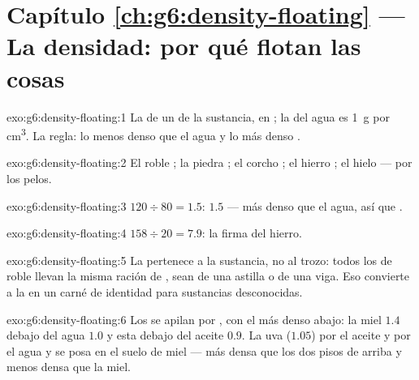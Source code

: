 \section*{Capítulo \ref{ch:g6:density-floating} --- La densidad: por qué flotan las cosas}

\begin{solution}{exo:g6:density-floating:1}
La  de un  de la sustancia, en
; la del agua es \qty{1}{g} por \unit{cm^3}. La regla: lo menos
denso que el agua  y lo más denso .
\end{solution}

\begin{solution}{exo:g6:density-floating:2}
El roble ; la piedra ; el corcho ; el
hierro ; el hielo  --- por los pelos.
\end{solution}

\begin{solution}{exo:g6:density-floating:3}
$120 \div 80 = 1.5$:  $1.5$ --- más denso que el agua, así
que .
\end{solution}

\begin{solution}{exo:g6:density-floating:4}
$158 \div 20 = 7.9$: la firma del hierro.
\end{solution}

\begin{solution}{exo:g6:density-floating:5}
La  pertenece a la sustancia, no al trozo: todos los
 de roble llevan la misma ración de ,
sean de una astilla o de una viga. Eso convierte a la  en
un carné de identidad para sustancias desconocidas.
\end{solution}

\begin{solution}{exo:g6:density-floating:6}
Los  se apilan por , con el más denso abajo:
la miel $1.4$ debajo del agua $1.0$ y esta debajo del aceite $0.9$. La
uva ($1.05$)  por el aceite y por el agua y se posa en el
suelo de miel --- más densa que los dos pisos de arriba y menos densa
que la miel.
\end{solution}

